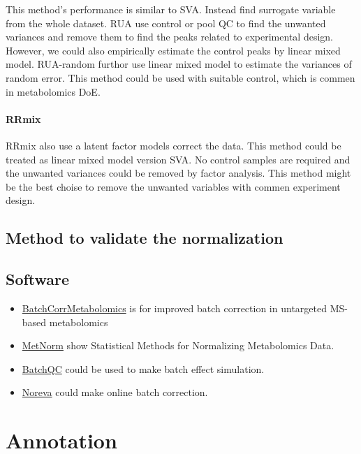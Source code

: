 \documentclass[
]{book}
\begin{document}
This method's performance is similar to SVA. Instead find surrogate variable from the whole dataset. RUA use control or pool QC to find the unwanted variances and remove them to find the peaks related to experimental design. However, we could also empirically estimate the control peaks by linear mixed model. RUA-random\citep{livera2015} furthor use linear mixed model to estimate the variances of random error. This method could be used with suitable control, which is commen in metabolomics DoE.

\hypertarget{rrmix}{%
\subsubsection{RRmix}\label{rrmix}}

RRmix also use a latent factor models correct the data\citep{jr2017}. This method could be treated as linear mixed model version SVA. No control samples are required and the unwanted variances could be removed by factor analysis. This method might be the best choise to remove the unwanted variables with commen experiment design.

\hypertarget{method-to-validate-the-normalization}{%
\section{Method to validate the normalization}\label{method-to-validate-the-normalization}}

\hypertarget{software-2}{%
\section{Software}\label{software-2}}

\begin{itemize}
\item
  \href{https://github.com/rwehrens/BatchCorrMetabolomics}{BatchCorrMetabolomics} is for improved batch correction in untargeted MS-based metabolomics
\item
  \href{https://github.com/cran/MetNorm}{MetNorm} show Statistical Methods for Normalizing Metabolomics Data.
\item
  \href{https://github.com/mani2012/BatchQC}{BatchQC} could be used to make batch effect simulation.
\item
  \href{http://idrb.zju.edu.cn/noreva/}{Noreva} could make online batch correction.
\end{itemize}

\hypertarget{annotation}{%
\chapter{Annotation}\label{annotation}}
\end{document}
